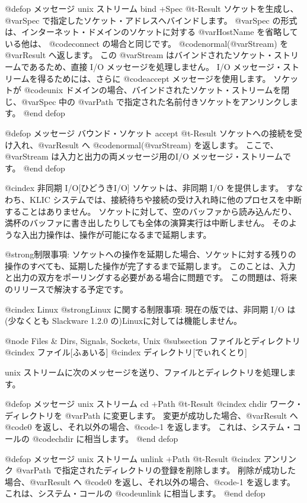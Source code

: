 {{{{@defop {メッセージ} {unix ストリーム} bind +Spec @t{-}Result
ソケットを生成し、@var{Spec} で指定したソケット・アドレスへバインドします。
@var{Spec} の形式は、インターネット・ドメインのソケットに対する @var{HostName} を省略している他は、 @code{connect} の場合と同じです。
@code{normal(@var{Stream})} を @var{Result} へ返します。
この @var{Stream} はバインドされたソケット・ストリームであるため、直接 I/O メッセージを処理しません。
I/O メッセージ・ストリームを得るためには、さらに @code{accept} メッセージを使用します。
ソケットが @code{unix} ドメインの場合、バインドされたソケット・ストリームを閉じ、@var{Spec} 中の @var{Path} で指定された名前付きソケットをアンリンクします。
@end defop

@defop {メッセージ} {バウンド・ソケット} accept @t{-}Result
ソケットへの接続を受け入れ、@var{Result} へ @code{normal(@var{Stream})} を返します。
ここで、@var{Stream} は入力と出力の両メッセージ用のI/O メッセージ・ストリームです。
@end defop

@cindex 非同期 I/O[ひどうきI/O]
ソケットは、非同期 I/O を提供します。
すなわち、KLIC システムでは、接続待ちや接続の受け入れ時に他のプロセスを中断することはありません。
ソケットに対して、空のバッファから読み込んだり、満杯のバッファに書き出したりしても全体の演算実行は中断しません。
そのような入出力操作は、操作が可能になるまで延期します。

@strong{制限事項}:
ソケットへの操作を延期した場合、ソケットに対する残りの操作のすべても、延期した操作が完了するまで延期します。
このことは、入力と出力の双方をポーリングする必要がある場合に問題です。
この問題は、将来のリリースで解決する予定です。

@cindex Linux
@strong{Linux に関する制限事項}:
現在の版では、非同期 I/O は(少なくとも Slackware 1.2.0 の)Linuxに対しては機能しません。

@node Files & Dirs, Signals, Sockets, Unix
@subsection ファイルとディレクトリ
@cindex ファイル[ふぁいる]
@cindex ディレクトリ[でぃれくとり]

unix ストリームに次のメッセージを送り、ファイルとディレクトリを処理します。

@defop {メッセージ} {unix ストリーム} cd +Path @t{-}Result
@cindex chdir
ワーク・ディレクトリを @var{Path} に変更します。
変更が成功した場合、@var{Result} へ @code{0} を返し、それ以外の場合、@code{-1} を返します。
これは、システム・コールの @code{chdir} に相当します。
@end defop

@defop {メッセージ} {unix ストリーム}  unlink +Path @t{-}Result
@cindex アンリンク
@var{Path} で指定されたディレクトリの登録を削除します。
削除が成功した場合、@var{Result} へ @code{0} を返し、それ以外の場合、@code{-1} を返します。
これは、システム・コールの @code{unlink} に相当します。
@end defop

}}}}
